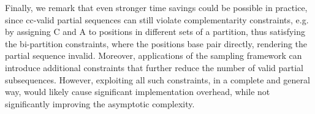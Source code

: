 \documentclass[10pt]{article}
\newcommand{\Def}[1]{\emph{#1}}
\newcommand{\Nuc}[1]{{\sf #1}}
\newcommand{\Ab}{\Nuc{A}}
\newcommand{\Cb}{\Nuc{C}}
\newcommand{\Gb}{\Nuc{G}}
\newcommand{\Ub}{\Nuc{U}}
\newcommand{\citet}[1]{\cite{#1}}
\begin{document}
Finally, we remark that even stronger time savings could be possible
in practice, since cc-valid partial sequences can still violate
complementarity constraints, e.g. by assigning C and A to positions in
different sets of a partition, thus satisfying the bi-partition
constraints, where the positions base pair directly, rendering the
partial sequence invalid. Moreover, applications of the sampling
framework can introduce additional constraints that further reduce
the number of valid partial subsequences. However, exploiting all such
constraints, in a complete and general way, would likely cause significant
implementation overhead, while not significantly improving
the asymptotic complexity.


%
%
\end{document}
